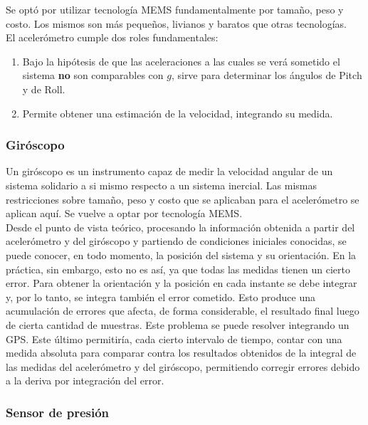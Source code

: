 \documentclass[main]{subfiles}
\begin{document}
Se opt\'o por utilizar tecnolog\'ia MEMS fundamentalmente por tama\~no, peso y costo. Los mismos son m\'as peque\~nos, livianos y baratos que otras tecnolog\'ias.\\


El aceler\'ometro cumple dos roles fundamentales:
\begin{enumerate}
\item Bajo la hip\'otesis de que las aceleraciones a las cuales se ver\'a sometido el sistema \textbf{no} son comparables con $g$, sirve para determinar los \'angulos de Pitch y de Roll.
\item Permite obtener una estimaci\'on de la velocidad, integrando su medida.  
\end{enumerate}

 
\subsubsection{Gir\'oscopo}
\label{giro}

Un gir\'oscopo es un instrumento capaz de medir la velocidad angular de un sistema solidario a si mismo respecto a un sistema inercial. Las mismas restricciones sobre tama\~no, peso y costo que se aplicaban para el aceler\'ometro se aplican aqu\'i. Se vuelve a optar por tecnolog\'ia MEMS.\\ 

Desde el punto de vista te\'orico, procesando la informaci\'on obtenida a partir del aceler\'ometro y del gir\'oscopo y partiendo de condiciones iniciales conocidas, se puede conocer, en todo momento, la posici\'on del sistema y su orientaci\'on. En la pr\'actica, sin embargo, esto no es as\'i, ya que todas las medidas tienen un cierto error. Para obtener la orientaci\'on y la posici\'on en cada instante se debe integrar y, por lo tanto, se integra tambi\'en el error cometido. Esto produce una acumulaci\'on de errores que afecta, de forma considerable, el resultado final luego de cierta cantidad de muestras. Este problema se puede resolver integrando un GPS. Este \'ultimo permitir\'ia, cada cierto intervalo de tiempo, contar con una medida absoluta para comparar contra los resultados obtenidos de la integral de las medidas del aceler\'ometro y del gir\'oscopo, permitiendo corregir errores debido a la deriva por integraci\'on del error.

\subsubsection{Sensor de presi\'on}
\end{document}
